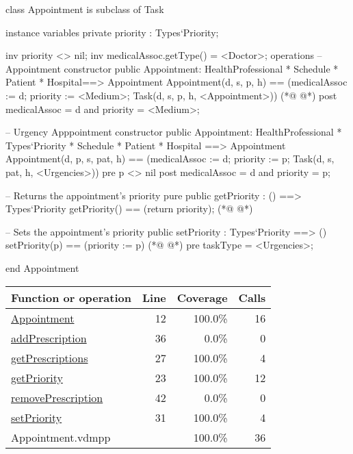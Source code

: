 \begin{vdmpp}[breaklines=true]
class Appointment is subclass of Task

instance variables
  private priority : Types`Priority;
  
  inv priority <> nil;
  inv medicalAssoc.getType() = <Doctor>;
operations
 -- Appointment constructor
 public Appointment: HealthProfessional * Schedule * Patient * Hospital==> Appointment
  Appointment(d, s, p, h) == (medicalAssoc := d; priority := <Medium>; Task(d, s, p, h, <Appointment>))
(*@
\label{Appointment:12}
@*)
 post medicalAssoc = d and priority = <Medium>;
 
 -- Urgency Apppointment constructor
 public Appointment: HealthProfessional * Types`Priority * Schedule * Patient * Hospital ==> Appointment
  Appointment(d, p, s, pat, h) == (medicalAssoc := d; priority := p; Task(d, s, pat, h, <Urgencies>))
 pre p <> nil
 post medicalAssoc = d and priority = p;

 -- Returns the appointment's priority
 pure public getPriority : () ==> Types`Priority
  getPriority() == (return priority);
(*@
\label{getPriority:23}
@*)

  -- Sets the appointment's priority
  public setPriority : Types`Priority ==> ()
   setPriority(p) == (priority := p)
(*@
\label{getPrescriptions:27}
@*)
  pre taskType = <Urgencies>;
  
end Appointment
\end{vdmpp}
\bigskip
\begin{longtable}{|l|r|r|r|}
\hline
Function or operation & Line & Coverage & Calls \\
\hline
\hline
\hyperref[Appointment:12]{Appointment} & 12&100.0\% & 16 \\
\hline
\hyperref[addPrescription:36]{addPrescription} & 36&0.0\% & 0 \\
\hline
\hyperref[getPrescriptions:27]{getPrescriptions} & 27&100.0\% & 4 \\
\hline
\hyperref[getPriority:23]{getPriority} & 23&100.0\% & 12 \\
\hline
\hyperref[removePrescription:42]{removePrescription} & 42&0.0\% & 0 \\
\hline
\hyperref[setPriority:31]{setPriority} & 31&100.0\% & 4 \\
\hline
\hline
Appointment.vdmpp & & 100.0\% & 36 \\
\hline
\end{longtable}

